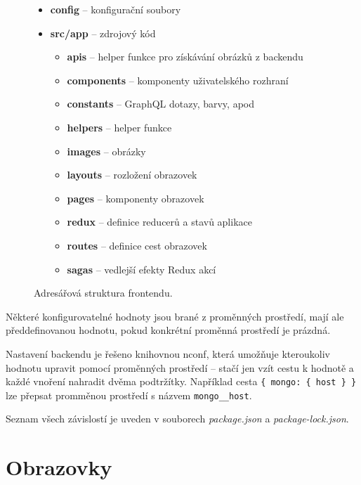 \begin{figure}[!htb]
    \begin{itemize}
      \setlength\itemsep{.05em}
      \item \textbf{config} -- konfigurační soubory
      \item \textbf{src/app} -- zdrojový kód
      \begin{itemize}
        \setlength\itemsep{.05em}
        \item \textbf{apis} -- helper funkce pro získávání obrázků z backendu
        \item \textbf{components} -- komponenty uživatelského rozhraní
        \item \textbf{constants} -- GraphQL dotazy, barvy, apod
        \item \textbf{helpers} -- helper funkce
        \item \textbf{images} -- obrázky
        \item \textbf{layouts} -- rozložení obrazovek
        \item \textbf{pages} -- komponenty obrazovek
        \item \textbf{redux} -- definice reducerů a stavů aplikace
        \item \textbf{routes} -- definice cest obrazovek
        \item \textbf{sagas} -- vedlejší efekty Redux akcí
      \end{itemize}
    \end{itemize}
    \caption{Adresářová struktura frontendu.}
    \label{fig:structure_front}
  \end{figure}

\newpage

Některé konfigurovatelné hodnoty jsou brané z proměnných prostředí, mají ale předdefinovanou hodnotu, pokud
konkrétní proměnná prostředí je prázdná.

Nastavení backendu je řešeno knihovnou nconf, která umožňuje kteroukoliv hodnotu upravit
pomocí proměnných prostředí -- stačí jen vzít cestu k hodnotě a každé vnoření nahradit 
dvěma podtržítky.
\citep[][]{nconf}
Například cesta \texttt{\{ mongo: \{ host \} \}} lze přepsat promměnou prostředí s názvem \texttt{mongo\_\_host}.

Seznam všech závislostí je uveden v souborech \textit{package.json} a \textit{package-lock.json}.

\section{Obrazovky}

